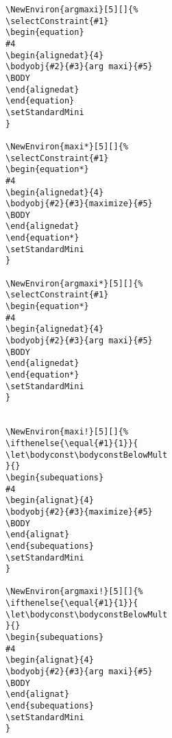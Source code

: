 \documentclass[]{report}
\begin{document}
\begin{verbatim}
\NewEnviron{argmaxi}[5][]{%
\selectConstraint{#1}
\begin{equation}
#4
\begin{alignedat}{4}
\bodyobj{#2}{#3}{arg maxi}{#5}
\BODY
\end{alignedat}
\end{equation}
\setStandardMini
}

\NewEnviron{maxi*}[5][]{%
\selectConstraint{#1}
\begin{equation*}
#4
\begin{alignedat}{4}
\bodyobj{#2}{#3}{maximize}{#5}
\BODY
\end{alignedat}
\end{equation*}
\setStandardMini
}

\NewEnviron{argmaxi*}[5][]{%
\selectConstraint{#1}
\begin{equation*}
#4
\begin{alignedat}{4}
\bodyobj{#2}{#3}{arg maxi}{#5}
\BODY
\end{alignedat}
\end{equation*}
\setStandardMini
}


\NewEnviron{maxi!}[5][]{%
\ifthenelse{\equal{#1}{1}}{
\let\bodyconst\bodyconstBelowMult
}{}
\begin{subequations}
#4
\begin{alignat}{4}
\bodyobj{#2}{#3}{maximize}{#5}		
\BODY
\end{alignat}
\end{subequations}	
\setStandardMini		
}

\NewEnviron{argmaxi!}[5][]{%
\ifthenelse{\equal{#1}{1}}{
\let\bodyconst\bodyconstBelowMult
}{}
\begin{subequations}
#4
\begin{alignat}{4}
\bodyobj{#2}{#3}{arg maxi}{#5}		
\BODY
\end{alignat}
\end{subequations}
\setStandardMini			
}
\end{verbatim}
\end{document}
